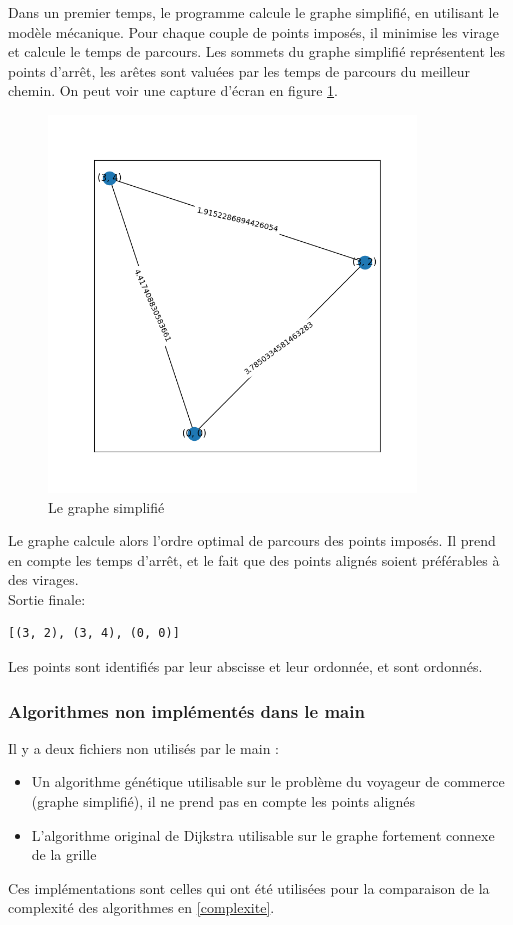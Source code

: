 Dans un premier temps, le programme calcule le graphe simplifié, en utilisant le modèle mécanique. Pour chaque couple de points imposés, il minimise les virage et calcule le temps de parcours. Les sommets du graphe simplifié représentent les points d'arrêt, les arêtes sont valuées par les temps de parcours du meilleur chemin. On peut voir une capture d'écran en figure \ref{fig:grapheSimp2}.
\begin{figure}
	\centering
	\includegraphics[height=10cm]{grapheSimp2.png}
	\caption{Le graphe simplifié}
	\label{fig:grapheSimp2}
\end{figure}
Le graphe calcule alors l'ordre optimal de parcours des points imposés. Il prend en compte les temps d'arrêt, et le fait que des points alignés soient préférables à des virages.\\
Sortie finale:
\begin{verbatim}
[(3, 2), (3, 4), (0, 0)]
\end{verbatim}
Les points sont identifiés par leur abscisse et leur ordonnée, et sont ordonnés.
\subsubsection*{Algorithmes non implémentés dans le main}
Il y a deux fichiers non utilisés par le main :
\begin{itemize}
	\item Un algorithme génétique utilisable sur le problème du voyageur de commerce (graphe simplifié), il ne prend pas en compte les points alignés
	\item L'algorithme original de Dijkstra utilisable sur le graphe fortement connexe de la grille
\end{itemize}
Ces implémentations sont celles qui ont été utilisées pour la comparaison de la complexité des algorithmes en \ref{complexite}.
